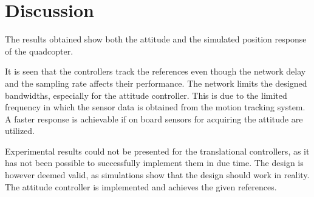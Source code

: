 \section{Discussion}\label{sec:discussion}

The results obtained show both the attitude and the simulated position response of the quadcopter. 

It is seen that the controllers track the references even though the network delay and the sampling rate affects their performance. The network limits the designed bandwidths, especially for the attitude controller. This is due to the limited frequency in which the sensor data is obtained from the motion tracking system. A faster response is achievable if on board sensors for acquiring the attitude are utilized.

Experimental results could not be presented for the translational controllers, as it has not been possible to successfully implement them in due time. The design is however deemed valid, as simulations show that the design should work in reality. The attitude controller is implemented and achieves the given references.

%
